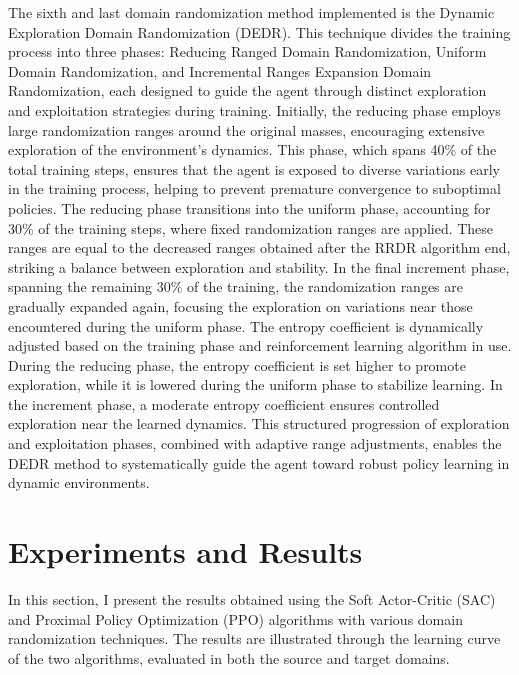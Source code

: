 \documentclass[11pt]{article}
\begin{document}
The sixth and last domain randomization method implemented is the Dynamic Exploration Domain Randomization (DEDR). This technique divides the training process into three phases: Reducing Ranged Domain Randomization, Uniform Domain Randomization, and Incremental Ranges Expansion Domain Randomization, each designed to guide the agent through distinct exploration and exploitation strategies during training. Initially, the reducing phase employs large randomization ranges around the original masses, encouraging extensive exploration of the environment's dynamics. This phase, which spans 40\% of the total training steps, ensures that the agent is exposed to diverse variations early in the training process, helping to prevent premature convergence to suboptimal policies. The reducing phase transitions into the uniform phase, accounting for 30\% of the training steps, where fixed randomization ranges are applied. These ranges are equal to the decreased ranges obtained after the RRDR algorithm end, striking a balance between exploration and stability. In the final increment phase, spanning the remaining 30\% of the training, the randomization ranges are gradually expanded again, focusing the exploration on variations near those encountered during the uniform phase. The entropy coefficient is dynamically adjusted based on the training phase and reinforcement learning algorithm in use. During the reducing phase, the entropy coefficient is set higher to promote exploration, while it is lowered during the uniform phase to stabilize learning. In the increment phase, a moderate entropy coefficient ensures controlled exploration near the learned dynamics. This structured progression of exploration and exploitation phases, combined with adaptive range adjustments, enables the DEDR method to systematically guide the agent toward robust policy learning in dynamic environments.\\

\section{Experiments and Results}

In this section, I present the results obtained using the Soft Actor-Critic (SAC) and Proximal Policy Optimization (PPO) algorithms with various domain randomization techniques. The results are illustrated through the learning curve of the two algorithms, evaluated in both the source and target domains.
\end{document}
